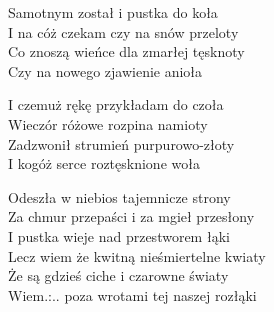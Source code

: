 \begin{text}
    Samotnym został i pustka do koła\\
    I na cóż czekam czy na snów przeloty\\
    Co znoszą wieńce dla zmarłej tęsknoty\\
    Czy na nowego zjawienie anioła

    I czemuż rękę przykładam do czoła\\
    Wieczór różowe rozpina namioty\\
    Zadzwonił strumień purpurowo-złoty\\
    I kogóż serce roztęsknione woła

    Odeszła w niebios tajemnicze strony\\
    Za chmur przepaści i za mgieł przesłony\\
    I pustka wieje nad przestworem łąki\\
    Lecz wiem że kwitną nieśmiertelne kwiaty\\
    Że są gdzieś ciche i czarowne światy\\
    Wiem.:.. poza wrotami tej naszej rozłąki
\end{text}
\begin{chord}

\end{chord}